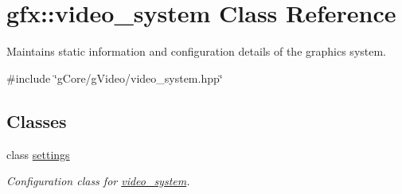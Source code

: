 \hypertarget{classgfx_1_1video__system}{\section{gfx\-:\-:video\-\_\-system Class Reference}
\label{classgfx_1_1video__system}
}


Maintains static information and configuration details of the graphics system.  




{\ttfamily \#include \char`\"{}g\-Core/g\-Video/video\-\_\-system.\-hpp\char`\"{}}

\subsection*{Classes}
\begin{DoxyCompactItemize}
\item 
class \hyperlink{classgfx_1_1video__system_1_1settings}{settings}
\begin{DoxyCompactList}\small\item\em Configuration class for \hyperlink{classgfx_1_1video__system}{video\-\_\-system}. \end{DoxyCompactList}\end{DoxyCompactItemize}

